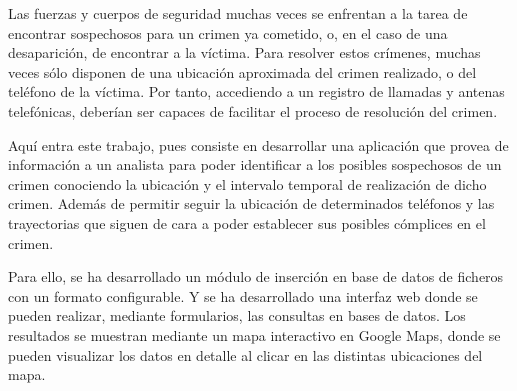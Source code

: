 Las fuerzas y cuerpos de seguridad muchas veces se enfrentan a la tarea de encontrar sospechosos para un crimen ya cometido, o, en el caso de una desaparición, de encontrar a la víctima. Para resolver estos crímenes, muchas veces sólo disponen de una ubicación aproximada del crimen realizado, o del teléfono de la víctima. Por tanto, accediendo a un registro de llamadas y antenas telefónicas, deberían ser capaces de facilitar el proceso de resolución del crimen.

Aquí entra este trabajo, pues consiste en desarrollar una aplicación que provea de información a un analista para poder identificar a los posibles sospechosos de un crimen conociendo la ubicación y el intervalo temporal de realización de dicho crimen. Además de permitir seguir la ubicación de determinados teléfonos y las trayectorias que siguen de cara a poder establecer sus posibles cómplices en el crimen. 

Para ello, se ha desarrollado un módulo de inserción en base de datos de ficheros con un formato configurable. Y se ha desarrollado una interfaz web donde se pueden realizar, mediante formularios, las consultas en bases de datos. Los resultados se muestran mediante un mapa interactivo en Google Maps, donde se pueden visualizar los datos en detalle al clicar en las distintas ubicaciones del mapa.


